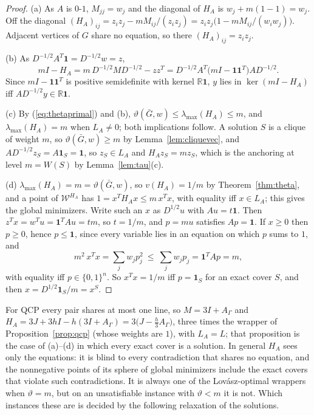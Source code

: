 \documentclass[11pt]{article}
\theoremstyle{definition}
\theoremstyle{remark}
\newcommand{\R}{\mathbb{R}}
\newcommand{\Wc}{\mathcal{W}}
\newcommand{\one}{\mathbf{1}}
\newcommand{\lmax}{\lambda_{\max}}
\newcommand{\vt}{\vartheta(\bar G,w)}
\begin{document}
\begin{proof}
(a) As $A$ is $0$-$1$, $M_{jj}=w_j$ and the diagonal of $H_A$ is
$w_j+m(1-1)=w_j$. Off the diagonal
$(H_A)_{ij}=z_iz_j-mM_{ij}/(z_iz_j)=z_iz_j\bigl(1-mM_{ij}/(w_iw_j)\bigr)$.
Adjacent vertices of $G$ share no equation, so there $(H_A)_{ij}=z_iz_j$.

(b) As $D^{-1/2}A^T\one=D^{-1/2}w=z$,
\[ mI-H_A=m\,D^{-1/2}MD^{-1/2}-zz^T
   =D^{-1/2}A^T\bigl(mI-\one\one^T\bigr)AD^{-1/2}. \]
Since $mI-\one\one^T$ is positive semidefinite with kernel $\R\one$, $y$ lies
in $\ker(mI-H_A)$ iff $AD^{-1/2}y\in\R\one$.

(c) By (\ref{eq:thetaprimal}) and (b), $\vt\leq\lmax(H_A)\leq m$, and
$\lmax(H_A)=m$ when $L_A\neq0$; both implications follow. A solution $S$ is
a clique of weight $m$, so
$\vt\geq m$ by Lemma~\ref{lem:cliquevec}, and $AD^{-1/2}z_S=A\one_S=\one$,
so $z_S\in L_A$ and $H_Az_S=mz_S$, which is the anchoring at level
$m=W(S)$ by Lemma~\ref{lem:tau}(c).

(d) $\lmax(H_A)=m=\vt$, so $v(H_A)=1/m$ by Theorem~\ref{thm:theta}, and a
point of $\Wc^{H_A}$ has $1=x^TH_Ax\leq m\,x^Tx$, with equality iff
$x\in L_A$; this gives the global minimizers. Write such an $x$ as
$D^{1/2}u$ with $Au=t\one$. Then $z^Tx=w^Tu=\one^TAu=tm$, so $t=1/m$, and
$p=mu$ satisfies $Ap=\one$. If $x\geq0$ then $p\geq0$, hence $p\leq\one$,
since every variable lies in an equation on which $p$ sums to $1$, and
\[ m^2\,x^Tx=\sum_j w_jp_j^2\ \leq\ \sum_j w_jp_j=\one^TAp=m, \]
with equality iff $p\in\{0,1\}^n$. So $x^Tx=1/m$ iff $p=\one_S$ for an exact
cover $S$, and then $x=D^{1/2}\one_S/m=x^S$.
\end{proof}

For QCP every pair shares at most one line, so $M=3I+A_\Gamma$ and
$H_A=3J+3hI-h(3I+A_\Gamma)=3\bigl(J-\frac h3A_\Gamma\bigr)$, three times the
wrapper of Proposition~\ref{prop:qcp} (whose weights are $1$), with
$L_A=L$; that proposition is the case of (a)--(d) in which every exact cover
is a solution. In general $H_A$ sees only the equations: it is blind to
every contradiction that shares no equation, and the nonnegative points of
its sphere of global minimizers include the exact covers that violate such
contradictions. It is always one of the Lov\'asz-optimal wrappers when
$\vartheta=m$, but on an unsatisfiable instance with $\vartheta<m$ it is
not. Which instances these are is decided by the following relaxation of the
solutions.
\end{document}
